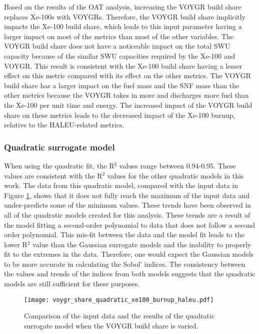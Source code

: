 Based on the results of the \gls{OAT} analysis, increasing the VOYGR build 
share replaces 
Xe-100s with VOYGRs. Therefore, the VOYGR build share implicitly 
impacts the Xe-100 build share, which leads to this input parameter 
having a larger impact on most of the metrics than most of the other variables. 
The VOYGR build share does not have a noticeable impact on the 
total \gls{SWU} capacity because of the similar \gls{SWU} capacities 
required by the Xe-100 and VOYGR. This result is consistent with the 
Xe-100 build share having a lesser effect on this metric compared 
with its effect on the other metrics. 
The VOYGR build share has a larger impact on the fuel mass and the 
\gls{SNF} mass than the other metrics because the VOYGR takes in more 
and discharges more fuel than the Xe-100 per unit time and energy. 
The 
increased impact of the VOYGR build share on these metrics leads to 
the decreased impact of the Xe-100 burnup, relative to the 
\gls{HALEU}-related metrics. 


\subsubsection{Quadratic surrogate model}
When using the quadratic fit, the R$^2$ values range between 0.94-0.95. 
These values are consistent with the R$^2$ values for the other 
quadratic models in this work. The data from this quadratic model,
compared with the input data in Figure \ref{fig:s7_voygr_quadratic}, 
shows that it does not fully reach the maximum of the input data
and under-predicts some of the minimum values. These trends have 
been observed in all of the quadratic models created for this analysis. 
These trends are a result of the model fitting a second-order 
polynomial to data that does not follow a second order polynomial. This 
mis-fit between the data and the model fit leads to the lower R$^2$ value 
than the Gaussian surrogate models and the inability to properly fit 
to the extremes in the data. Therefore, one would expect the 
Gaussian models to be more accurate in calculating the Sobol' 
indices. The consistency between the values and trends of the 
indices from both models suggests that the quadratic models are 
still sufficient for these purposes. 

\begin{figure}
    \centering 
    \texttt{[image: voygr\_share\_quadratic\_xe100\_burnup\_haleu.pdf]}
    \caption{Comparison of the input data and the results of the quadratic 
    surrogate model when the VOYGR build share is varied.}
    \label{fig:s7_voygr_quadratic}
\end{figure}

